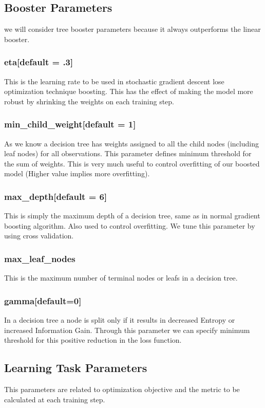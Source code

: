 \subsection{Booster Parameters} we will consider tree booster parameters because
it always outperforms the linear booster.

\subsubsection{eta[default = .3]} This is the learning rate to be used in
stochastic gradient descent lose optimization technique boosting. This has the
effect of making the model more robust by shrinking the weights on each training
step.

\subsubsection{min\_child\_weight[default = 1]} As we know a decision tree has
weights assigned to all the child nodes (including leaf nodes) for all
observations. This parameter defines minimum threshold for the sum of weights.
This is very much useful to control overfitting of our boosted model  (Higher
value implies more overfitting).

\subsubsection{max\_depth[default = 6]} This is simply the maximum depth of a
decision tree, same as in normal gradient boosting algorithm. Also used to
control overfitting. We tune this parameter by using cross validation.

\subsubsection{max\_leaf\_nodes}
This is the maximum number of terminal nodes or leafs in a decision tree.

\subsubsection{gamma[default=0]} In a decision tree a node is split only if it
results in decreased Entropy or increased Information Gain. Through this
parameter  we can specify minimum threshold for this positive reduction in the
loss function.

\subsection{Learning Task Parameters} This parameters are related to
optimization objective and the metric to be calculated at each training step.

